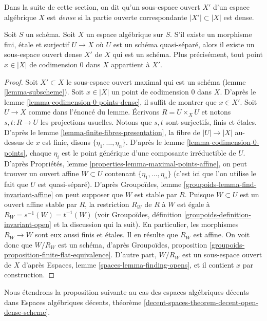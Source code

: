 \noindent
Dans la suite de cette section, on dit qu'un sous-espace ouvert
$X'$ d'un espace algébrique $X$ est {\it dense} si la partie ouverte
correspondante $|X'| \subset |X|$ est dense.

\begin{lemma}
\label{lemma-quasi-separated-finite-etale-cover-dense-open-scheme}
Soit $S$ un schéma. Soit $X$ un espace algébrique sur $S$.
S'il existe un morphisme fini, \'etale et surjectif
$U \to X$ où $U$ est un schéma quasi-séparé, alors
il existe un sous-espace ouvert dense $X'$ de $X$ qui est un schéma.
Plus précisément, tout point $x \in |X|$ de codimension $0$ dans $X$
appartient à $X'$.
\end{lemma}

\begin{proof}
Soit $X' \subset X$ le sous-espace ouvert maximal qui est un schéma
(lemme \ref{lemma-subscheme}).
Soit $x \in |X|$ un point de codimension $0$ dans $X$.
D'après le lemme \ref{lemma-codimension-0-points-dense},
il suffit de montrer que $x \in X'$.
Soit $U \to X$ comme dans l'énoncé du lemme.
Écrivons $R = U \times_X U$ et notons $s, t : R \to U$ les projections usuelles.
Notons que $s, t$ sont surjectifs, finis et \'etales.
D'après le lemme \ref{lemma-finite-fibres-presentation},
la fibre de $|U| \to |X|$ au-dessus de $x$ est finie, disons
$\{\eta_1, \ldots, \eta_n\}$. D'après le lemme \ref{lemma-codimension-0-points},
chaque $\eta_i$ est le point générique d'une composante irréductible de $U$.
D'après Propriétés, lemme \ref{properties-lemma-maximal-points-affine},
on peut trouver un ouvert affine $W \subset U$ contenant
$\{\eta_1, \ldots, \eta_n\}$
(c'est ici que l'on utilise le fait que $U$ est quasi-séparé). D'après
Groupoïdes, lemme \ref{groupoids-lemma-find-invariant-affine}
on peut supposer que $W$ est stable par $R$.
Puisque $W \subset U$ est un ouvert affine stable par $R$, la restriction
$R_W$ de $R$ à $W$ est égale à $R_W = s^{-1}(W) = t^{-1}(W)$ (voir
Groupoïdes, définition \ref{groupoids-definition-invariant-open}
et la discussion qui la suit). En particulier, les morphismes $R_W \to W$ sont
eux aussi finis et \'etales. Il en résulte que $R_W$ est affine.
On voit donc que $W/R_W$ est un schéma, d'après
Groupoïdes, proposition \ref{groupoids-proposition-finite-flat-equivalence}.
D'autre part, $W/R_W$ est un sous-espace ouvert de $X$ d'après
Espaces, lemme \ref{spaces-lemma-finding-opens}, et il contient
$x$ par construction.
\end{proof}

\noindent
Nous étendrons la proposition suivante au cas des
espaces algébriques décents dans
Espaces algébriques décents, théorème
\ref{decent-spaces-theorem-decent-open-dense-scheme}.

